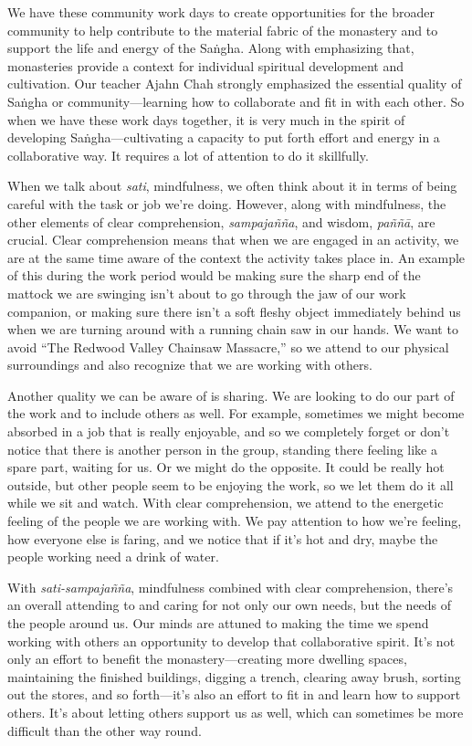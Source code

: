 
We have these community work days to create opportunities for the 
broader community to help contribute to the material fabric of the 
monastery and to support the life and energy of the Saṅgha. Along 
with emphasizing that, monasteries provide a context for individual 
spiritual development and cultivation. Our teacher Ajahn Chah strongly 
emphasized the essential quality of Saṅgha or community---learning 
how to collaborate and fit in with each other. So when we have these 
work days together, it is very much in the spirit of developing 
Saṅgha---cultivating a capacity to put forth effort and energy in a 
collaborative way. It requires a lot of attention to do it skillfully.

When we talk about \emph{sati}, mindfulness, we often think about it in 
terms of being careful with the task or job we're doing. However, along 
with mindfulness, the other elements of clear comprehension, 
\emph{sampajañña}, and wisdom, \emph{paññā}, are crucial. Clear 
comprehension means that when we are engaged in an activity, we are at 
the same time aware of the context the activity takes place in. An 
example of this during the work period would be making sure the sharp 
end of the mattock we are swinging isn't about to go through the jaw of 
our work companion, or making sure there isn't a soft fleshy object 
immediately behind us when we are turning around with a running chain 
saw in our hands. We want to avoid ``The Redwood Valley Chainsaw 
Massacre,'' so we attend to our physical surroundings and also 
recognize that we are working with others.

Another quality we can be aware of is sharing. We are looking to do our 
part of the work and to include others as well. For example, sometimes 
we might become absorbed in a job that is really enjoyable, and so we 
completely forget or don't notice that there is another person in the 
group, standing there feeling like a spare part, waiting for us. Or we 
might do the opposite. It could be really hot outside, but other people 
seem to be enjoying the work, so we let them do it all while we sit and 
watch. With clear comprehension, we attend to the energetic feeling of 
the people we are working with. We pay attention to how we're feeling, 
how everyone else is faring, and we notice that if it's hot and dry, 
maybe the people working need a drink of water.

With \emph{sati-sampajañña}, mindfulness combined with clear 
comprehension, there's an overall attending to and caring for not only 
our own needs, but the needs of the people around us. Our minds are 
attuned to making the time we spend working with others an opportunity 
to develop that collaborative spirit. It's not only an effort to 
benefit the monastery---creating more dwelling spaces, maintaining the 
finished buildings, digging a trench, clearing away brush, sorting out 
the stores, and so forth---it's also an effort to fit in and learn how 
to support others. It's about letting others support us as well, which 
can sometimes be more difficult than the other way round.

